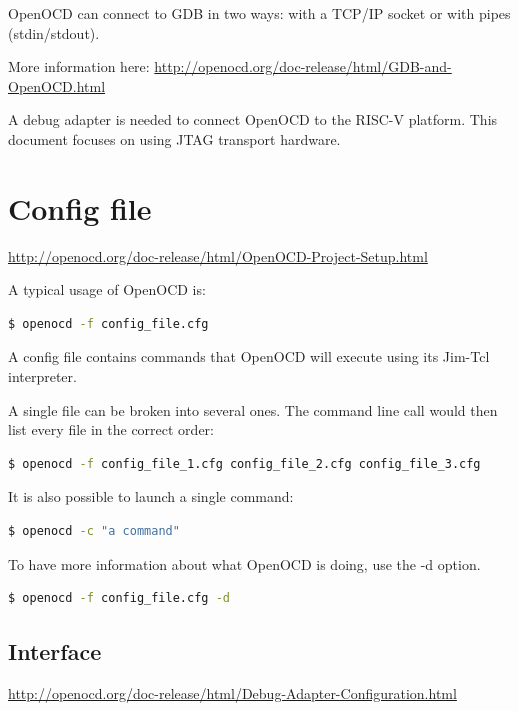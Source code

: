 \documentclass{article}
\begin{document}
	OpenOCD can connect to GDB in two ways: with a TCP/IP socket or with pipes (stdin/stdout). 
	
	More information here: \url{http://openocd.org/doc-release/html/GDB-and-OpenOCD.html}
	
	A debug adapter is needed to connect OpenOCD to the RISC-V platform. This document focuses on using JTAG transport hardware.
	
	\newpage
	\section{Config file}
	
	\url{http://openocd.org/doc-release/html/OpenOCD-Project-Setup.html}
	
	A typical usage of OpenOCD is:
	
	\begin{lstlisting}[language=bash]
    $ openocd -f config_file.cfg
    \end{lstlisting}
    
    A config file contains commands that OpenOCD will execute using its Jim-Tcl interpreter.
    
    A single file can be broken into several ones. The command line call would then list every file in the correct order:
    
    \begin{lstlisting}[language=bash]
    $ openocd -f config_file_1.cfg config_file_2.cfg config_file_3.cfg
    \end{lstlisting}
    
    It is also possible to launch a single command:
    
    \begin{lstlisting}[language=bash]
    $ openocd -c "a command"
    \end{lstlisting}
    
    To have more information about what OpenOCD is doing, use the -d option.
    
    \begin{lstlisting}[language=bash]
    $ openocd -f config_file.cfg -d
    \end{lstlisting}
    
    \subsection{Interface}
    
    \url{http://openocd.org/doc-release/html/Debug-Adapter-Configuration.html}
    
\end{document}
